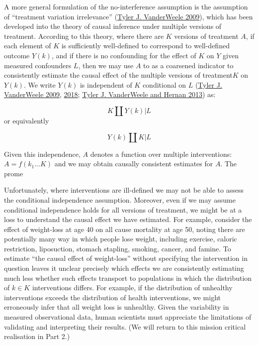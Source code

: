 \documentclass[
  singlecolumn]{report}
\begin{document}
A more general formulation of the no-interference assumption is the
assumption of ``treatment variation irrelevance''
(\protect\hyperlink{ref-vanderweele2009}{Tyler J. VanderWeele 2009}),
which has been developed into the theory of causal inference under
multiple versions of treatment. According to this theory, where there
are \(K\) versions of treatment \(A\), if each element of \(K\) is
sufficiently well-defined to correspond to well-defined outcome
\(Y(k)\), and if there is no confounding for the effect of \(K\) on
\(Y\) given measured confounders \(L\), then we may use \(A\) to as a
coarsened indicator to consistently estimate the causal effect of the
multiple versions of treatment\(K\) on \(Y(k)\). We write \(Y(k)\) is
independent of \(K\) conditional on \(L\)
(\protect\hyperlink{ref-vanderweele2009}{Tyler J. VanderWeele 2009},
\protect\hyperlink{ref-vanderweele2018}{2018};
\protect\hyperlink{ref-vanderweele2013}{Tyler J. VanderWeele and Hernan
2013}) as:

\[K \coprod Y(k) | L\] or equivalently

\[Y(k) \coprod K | L\]

Given this independence, \(A\) denotes a function over multiple
interventions: \(A = f(k_1\dots K)\) and we may obtain causally
consistent estimates for \(A\). The prome

Unfortunately, where interventions are ill-defined we may not be able to
assess the conditional independence assumption. Moreover, even if we may
assume conditional independence holds for all versions of treatment, we
might be at a loss to understand the causal effect we have estimated.
For example, consider the effect of weight-loss at age 40 on all cause
mortality at age 50, noting there are potentially many way in which
people lose weight, including exercise, caloric restriction,
liposuction, stomach stapling, smoking, cancer, and famine. To estimate
``the causal effect of weight-loss'' without specifying the intervention
in question leaves it unclear precisely which effects we are
consistently estimating much less whether such effects transport to
populations in which the distribution of \(k \in K\) interventions
differs. For example, if the distribution of unhealthy interventions
exceeds the distribution of health interventions, we might erroneously
infer that all weight loss is unhealthy. Given the variability in
measured observational data, human scientists must appreciate the
limitations of validating and interpreting their results. (We will
return to this mission critical realisation in Part 2.)
\end{document}
